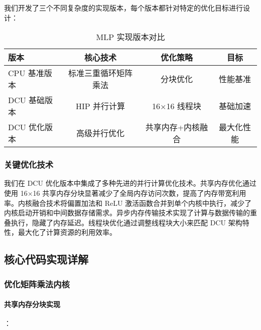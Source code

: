 \documentclass[a4paper]{article}
\begin{document}
我们开发了三个不同复杂度的实现版本，每个版本都针对特定的优化目标进行设计：

\begin{table}[h]
\centering
\begin{tabular}{@{}lccc@{}}
\toprule
版本 & 核心技术 & 优化策略 & 目标 \\
\midrule
CPU 基准版本 & 标准三重循环矩阵乘法 & 分块优化 & 性能基准 \\
DCU 基础版本 & HIP 并行计算 & 16×16 线程块 & 基础加速 \\
DCU 优化版本 & 高级并行优化 & 共享内存+内核融合 & 最大化性能 \\
\bottomrule
\end{tabular}
\caption{MLP 实现版本对比}
\end{table}

\subsubsection{关键优化技术}

我们在 DCU 优化版本中集成了多种先进的并行计算优化技术。共享内存优化通过使用 16×16 共享内存分块显著减少了全局内存访问次数，提高了内存带宽利用率。内核融合技术将偏置加法和 ReLU 激活函数合并到单个内核中执行，减少了内核启动开销和中间数据存储需求。异步内存传输技术实现了计算与数据传输的重叠执行，隐藏了内存延迟。线程块优化通过调整线程块大小来匹配 DCU 架构特性，最大化了计算资源的利用效率。

\subsection{核心代码实现详解}

\subsubsection{优化矩阵乘法内核}

\paragraph{共享内存分块实现}：
\end{document}
